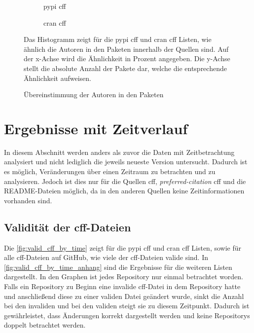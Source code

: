 \begin{figure}
    \begin{subfigure}{.5\textwidth}
        \centering
        
        \caption{\gls{pypi} \gls{cff}}
        \label{fig:similarity_pypi_cff}
    \end{subfigure}%
    \begin{subfigure}{.5\textwidth}
        \centering
        
        \caption{\gls{cran} \gls{cff}}
        \label{fig:similarity_cran_cff}
    \end{subfigure}
    \caption{Übereinstimmung der Autoren in den Paketen}
    \label{fig:similarities}
    \small
    Das Histogramm zeigt für die \gls{pypi} \gls{cff} und \gls{cran} \gls{cff} Listen, wie ähnlich die Autoren in den Paketen innerhalb der Quellen sind. Auf der x-Achse wird die Ähnlichkeit in Prozent angegeben. Die y-Achse stellt die absolute Anzahl der Pakete dar, welche die entsprechende Ähnlichkeit aufweisen.
\end{figure}

\section{Ergebnisse mit Zeitverlauf}
\label{sec:gesamtheit_ergebnisse}
In diesem Abschnitt werden anders als zuvor die Daten mit Zeitbetrachtung analysiert und nicht lediglich die jeweils neueste Version untersucht.
Dadurch ist es möglich, Veränderungen über einen Zeitraum zu betrachten und zu analysieren.
Jedoch ist dies nur für die Quellen \gls{cff}, \emph{preferred-citation} \gls{cff} und die README-Dateien möglich, da in den anderen Quellen keine Zeitinformationen vorhanden sind.

\subsection*{Validität der \gls{cff}-Dateien}
Die \autoref{fig:valid_cff_by_time} zeigt für die \gls{pypi} \gls{cff} und \gls{cran} \gls{cff} Listen, sowie für alle \gls{cff}-Dateien auf GitHub, wie viele der \gls{cff}-Dateien valide sind.
In \autoref{fig:valid_cff_by_time_anhang} sind die Ergebnisse für die weiteren Listen dargestellt.
In den Graphen ist jedes Repository nur einmal betrachtet worden.
Falls ein Repository zu Beginn eine invalide \gls{cff}-Datei in dem Repository hatte und anschließend diese zu einer validen Datei geändert wurde, sinkt die Anzahl bei den invaliden und bei den validen steigt sie zu diesem Zeitpunkt.
Dadurch ist gewährleistet, dass Änderungen korrekt dargestellt werden und keine Repositorys doppelt betrachtet werden.

